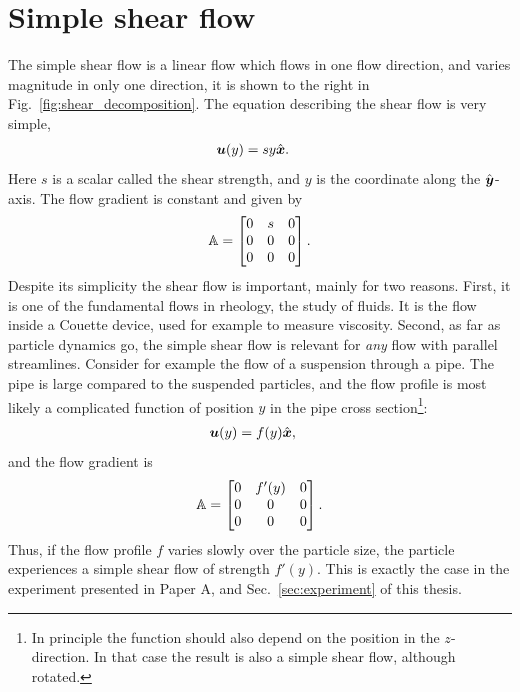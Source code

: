 \documentclass[thesis.tex]{subfiles}
\begin{document}
\section{Simple shear flow}\label{sec:shearflow}

The simple shear flow is a linear flow which flows in one flow direction, and varies magnitude in only one direction, it is shown to the right in Fig.~\ref{fig:shear_decomposition}. The equation describing the shear flow is very simple,
\begin{align*}
	\mbox{\boldmath$u$}(y) &= s y \hat{\mbox{\boldmath$x$}}.
\end{align*}
Here $s$ is a scalar called the shear strength, and $y$ is the coordinate along the $\hat{\mbox{\boldmath$y$}}$-axis. The flow gradient is constant and given by
\begin{align*}
	\mathbb{A} = \begin{bmatrix}
		0 & s & 0 \\
		0 & 0 & 0 \\
		0 & 0 & 0 
	\end{bmatrix}.
\end{align*}
Despite its simplicity the shear flow is important, mainly for two reasons. First, it is one of the fundamental flows in rheology, the study of fluids. It is the flow inside a Couette device, used for example to measure viscosity. Second, as far as particle dynamics go, the simple shear flow is relevant for \emph{any} flow with parallel streamlines. Consider for example the flow of a suspension through a pipe. The pipe is large compared to the suspended particles, and the flow profile is most likely a complicated function of position $y$ in the pipe cross section\footnote{In principle the function should also depend on the position in the $z$-direction. In that case the result is also a simple shear flow, although rotated.}:
\begin{align*}
	\mbox{\boldmath$u$}(y) &= f(y)\hat{\mbox{\boldmath$x$}},
\end{align*}
 and the flow gradient is
\begin{align*}
	\mathbb{A} = \begin{bmatrix}
		0 & f'(y) & 0 \\
		0 & 0 & 0 \\
		0 & 0 & 0 
	\end{bmatrix}.
\end{align*}
Thus, if the flow profile $f$ varies slowly over the particle size, the particle experiences a simple shear flow of strength $f'(y)$. This is exactly the case in the experiment presented in Paper A, and Sec.~\ref{sec:experiment} of this thesis.
\end{document}
